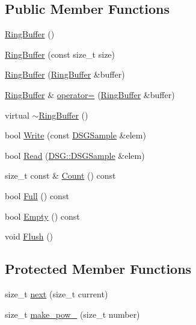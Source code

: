 \subsection*{Public Member Functions}
\begin{DoxyCompactItemize}
\item 
\hyperlink{class_d_s_g_1_1_ring_buffer_a3136c9debb3c422adb1d5835e11b2b99}{Ring\+Buffer} ()
\item 
\hyperlink{class_d_s_g_1_1_ring_buffer_ae9859fd3ad18961de494d8b50fe4763e}{Ring\+Buffer} (const size\+\_\+t size)
\item 
\hyperlink{class_d_s_g_1_1_ring_buffer_ab09f32dacee49df3281c6701b7a4d737}{Ring\+Buffer} (\hyperlink{class_d_s_g_1_1_ring_buffer}{Ring\+Buffer} \&buffer)
\item 
\hyperlink{class_d_s_g_1_1_ring_buffer}{Ring\+Buffer} \& \hyperlink{class_d_s_g_1_1_ring_buffer_a892fbcc12b2dca5b04ead96a09299e73}{operator=} (\hyperlink{class_d_s_g_1_1_ring_buffer}{Ring\+Buffer} \&buffer)
\item 
virtual \hyperlink{class_d_s_g_1_1_ring_buffer_a771d30b04b6f0313c203530685fbeb3a}{$\sim$\+Ring\+Buffer} ()
\item 
bool \hyperlink{class_d_s_g_1_1_ring_buffer_aa5dd2caa0a270173251faee40a43d692}{Write} (const \hyperlink{namespace_d_s_g_ac39a94cd27ebcd9c1e7502d0c624894a}{D\+S\+G\+Sample} \&elem)
\item 
bool \hyperlink{class_d_s_g_1_1_ring_buffer_a6b2848a64f15c7b0c320779582fa0fbe}{Read} (\hyperlink{namespace_d_s_g_ac39a94cd27ebcd9c1e7502d0c624894a}{D\+S\+G\+::\+D\+S\+G\+Sample} \&elem)
\item 
size\+\_\+t const \& \hyperlink{class_d_s_g_1_1_ring_buffer_a9bd79b0a6dff618b205e396c101ee070}{Count} () const 
\item 
bool \hyperlink{class_d_s_g_1_1_ring_buffer_a53ddb04ffcbb5470a8d2b0a3c65b70cb}{Full} () const 
\item 
bool \hyperlink{class_d_s_g_1_1_ring_buffer_ac1346f5842d08b988a5297abe4089b96}{Empty} () const 
\item 
void \hyperlink{class_d_s_g_1_1_ring_buffer_ab23c8003d2857809a816068eeb209d60}{Flush} ()
\end{DoxyCompactItemize}
\subsection*{Protected Member Functions}
\begin{DoxyCompactItemize}
\item 
size\+\_\+t \hyperlink{class_d_s_g_1_1_ring_buffer_a6d7a76a4c9b38ccde46344662e08c9e5}{next} (size\+\_\+t current)
\item 
size\+\_\+t \hyperlink{class_d_s_g_1_1_ring_buffer_aaf481e139011e91b111cc048e726cafb}{make\+\_\+pow\+\_} (size\+\_\+t number)
\end{DoxyCompactItemize}
